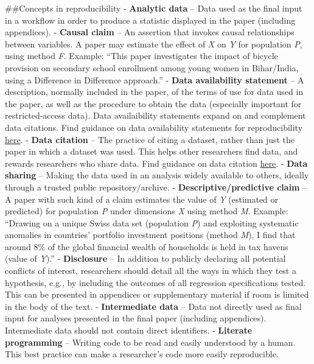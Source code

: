 \documentclass[]{book}
\begin{document}
\#\#Concepts in reproducibility
- \textbf{Analytic data} -- Data used as the final input in a workflow in order to produce a statistic displayed in the paper (including appendices).
- \textbf{Causal claim} -- An assertion that invokes causal relationships between variables. A paper may estimate the effect of \emph{X} on \emph{Y} for population \emph{P}, using method \emph{F}. Example: ``This paper investigates the impact of bicycle provision on secondary school enrollment among young women in Bihar/India, using a Difference in Difference approach.''
- \textbf{Data availability statement} -- A description, normally included in the paper, of the terms of use for data used in the paper, as well as the procedure to obtain the data (especially important for restricted-access data). Data availaibility statements expand on and complement data citations. Find guidance on data availability statements for reproducibility \href{https://social-science-data-editors.github.io/guidance/Requested_information_dcas.html\#what-are-data-and-code-availability-statements-dcas}{here}.
- \textbf{Data citation} -- The practice of citing a dataset, rather than just the paper in which a dataset was used. This helps other researchers find data, and rewards researchers who share data. Find guidance on data citation \href{https://social-science-data-editors.github.io/guidance/Data_citation_guidance.html}{here}.
- \textbf{Data sharing} -- Making the data used in an analysis widely available to others, ideally through a trusted public repository/archive.
- \textbf{Descriptive/predictive claim} -- A paper with such kind of a claim estimates the value of \emph{Y} (estimated or predicted) for population \emph{P} under dimensions \emph{X} using method \emph{M}. Example: ``Drawing on a unique Swiss data set (population \emph{P}) and exploiting systematic anomalies in countries' portfolio investment positions (method \emph{M}), I find that around 8\% of the global financial wealth of households is held in tax havens (value of \emph{Y}).''
- \textbf{Disclosure} -- In addition to publicly declaring all potential conflicts of interest, researchers should detail all the ways in which they test a hypothesis, e.g., by including the outcomes of all regression specifications tested. This can be presented in appendices or supplementary material if room is limited in the body of the text.
- \textbf{Intermediate data} -- Data not directly used as final input for analyses presented in the final paper (including appendices). Intermediate data should not contain direct identifiers.
- \textbf{Literate programming} -- Writing code to be read and easily understood by a human. This best practice can make a researcher's code more easily reproducible.
\end{document}
